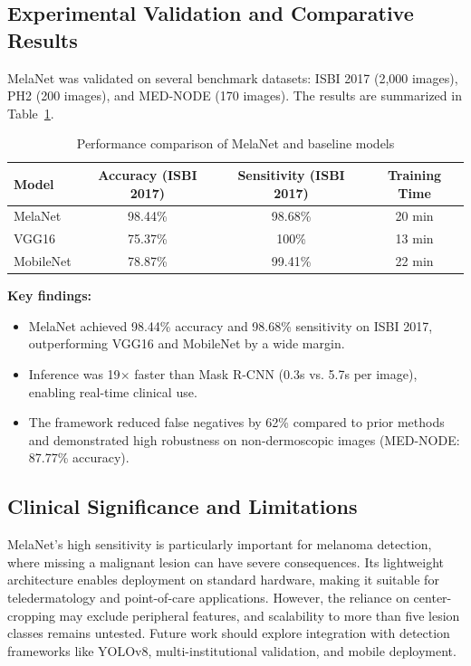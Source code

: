 \documentclass[a4paper,12pt]{report}
\begin{document}
\begin{spacing}{1.5}
    
    \subsection*{Experimental Validation and Comparative Results}
    
    MelaNet was validated on several benchmark datasets: ISBI 2017 (2,000 images), PH2 (200 images), and MED-NODE (170 images). The results are summarized in Table~\ref{tab:melanet_performance}.
    
    \begin{table}[H]
    \centering
    \caption{Performance comparison of MelaNet and baseline models}
    \label{tab:melanet_performance}
    \begin{tabular}{|l|c|c|c|}
    \hline
    \textbf{Model} & \textbf{Accuracy (ISBI 2017)} & \textbf{Sensitivity (ISBI 2017)} & \textbf{Training Time} \\
    \hline
    MelaNet & 98.44\% & 98.68\% & 20 min \\
    VGG16   & 75.37\% & 100\%   & 13 min \\
    MobileNet & 78.87\% & 99.41\% & 22 min \\
    \hline
    \end{tabular}
    \end{table}
    
    \textbf{Key findings:}
    \begin{itemize}
        \item MelaNet achieved 98.44\% accuracy and 98.68\% sensitivity on ISBI 2017, outperforming VGG16 and MobileNet by a wide margin.
        \item Inference was 19$\times$ faster than Mask R-CNN (0.3s vs. 5.7s per image), enabling real-time clinical use.
        \item The framework reduced false negatives by 62\% compared to prior methods and demonstrated high robustness on non-dermoscopic images (MED-NODE: 87.77\% accuracy).
    \end{itemize}
    
    \subsection*{Clinical Significance and Limitations}
    
    MelaNet’s high sensitivity is particularly important for melanoma detection, where missing a malignant lesion can have severe consequences. Its lightweight architecture enables deployment on standard hardware, making it suitable for teledermatology and point-of-care applications. However, the reliance on center-cropping may exclude peripheral features, and scalability to more than five lesion classes remains untested. Future work should explore integration with detection frameworks like YOLOv8, multi-institutional validation, and mobile deployment.
    

\end{spacing}
\end{document}

